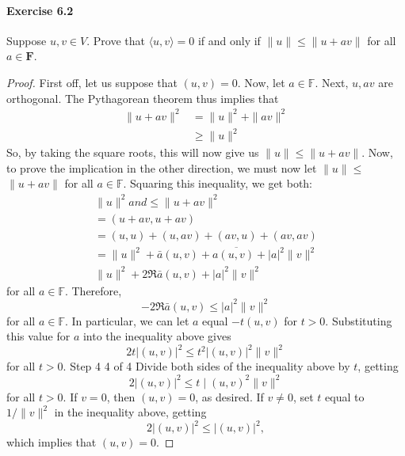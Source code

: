 \documentclass{article}
\theoremstyle{definition}
\begin{document}
\paragraph{Exercise 6.2} Suppose $u, v \in V$. Prove that $\langle u, v\rangle=0$ if and only if $\|u\| \leq\|u+a v\|$ for all $a \in \mathbf{F}$.
\begin{proof}
    First off, let us suppose that $(u, v)=0$.
Now, let $a \in \mathbb{F}$. Next, $u, a v$ are orthogonal.
The Pythagorean theorem thus implies that
$$
\begin{aligned}
\|u+a v\|^2 & =\|u\|^2+\|a v\|^2 \\
& \geq\|u\|^2
\end{aligned}
$$
So, by taking the square roots, this will now give us $\|u\| \leq\|u+a v\|$.
Now, to prove the implication in the other direction, we must now let $\|u\| \leq$ $\|u+a v\|$ for all $a \in \mathbb{F}$. Squaring this inequality, we get both:
$$
\begin{gathered}
\|u\|^2 a n d \leq\|u+a v\|^2 \\
=(u+a v, u+a v) \\
=(u, u)+(u, a v)+(a v, u)+(a v, a v) \\
=\|u\|^2+\bar{a}(u, v)+a \overline{(u, v)}+|a|^2\|v\|^2 \\
\|u\|^2+2 \Re \bar{a}(u, v)+|a|^2\|v\|^2
\end{gathered}
$$
for all $a \in \mathbb{F}$.
Therefore,
$$
-2 \Re \bar{a}(u, v) \leq|a|^2\|v\|^2
$$
for all $a \in \mathbb{F}$. In particular, we can let $a$ equal $-t(u, v)$ for $t>0$. Substituting this value for $a$ into the inequality above gives
$$
2 t|(u, v)|^2 \leq t^2|(u, v)|^2\|v\|^2
$$
for all $t>0$.
Step 4
4 of 4
Divide both sides of the inequality above by $t$, getting
$$
2|(u, v)|^2 \leq t \mid(u, v)^2\|v\|^2
$$
for all $t>0$. If $v=0$, then $(u, v)=0$, as desired. If $v \neq 0$, set $t$ equal to $1 /\|v\|^2$ in the inequality above, getting
$$
2|(u, v)|^2 \leq|(u, v)|^2,
$$
which implies that $(u, v)=0$.
\end{proof}
\end{document}
